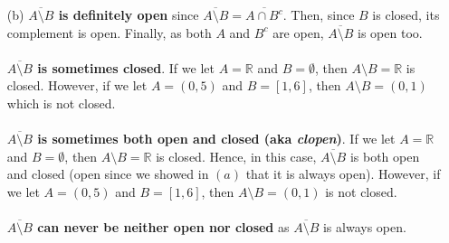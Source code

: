 \documentclass[11pt]{article}
\newcommand{\reals}{\mathbb{R}}
\begin{document}
\begin{itemize}
\begin{itemize}
            \item[(b)]
                \textbf{$\overline{A \setminus B}$ is definitely open} since
                $\overline{A \setminus B} = \overline{A \cap B^c}$. Then, since
                $B$ is closed, its complement is open. Finally, as both $A$ and
                $B^c$ are open, $\overline{A \setminus B}$ is open too.
                \\
                \\
                \textbf{$\overline{A \setminus B}$ is sometimes closed}. If we
                let $A = \reals$ and $B = \emptyset$, then $A \setminus B =
                \reals$ is closed. However, if we let $A = (0, 5)$ and $B = [1,
                6]$, then $A \setminus B = (0, 1)$ which is not closed.
                \\
                \\
                \textbf{$\overline{A \setminus B}$ is sometimes both open and
                closed (aka \textit{clopen})}. If we let $A = \reals$ and $B =
                \emptyset$, then $A \setminus B = \reals$ is closed. Hence, in
                this case, $\overline{A \setminus B}$ is both open and closed
                (open since we showed in $(a)$ that it is always open).
                However, if we let $A = (0, 5)$ and $B = [1, 6]$, then $A
                \setminus B = (0, 1)$ is not closed.
                \\
                \\
                \textbf{$\overline{A \setminus B}$ can never be neither open
                nor closed} as $\overline{A \setminus B}$ is always open.


\end{itemize}
\end{itemize}
\end{document}
